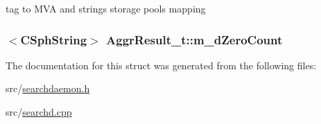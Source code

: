 tag to M\-V\-A and strings storage pools mapping 

\hypertarget{structAggrResult__t_a5b6c26a144fa7054522ef8f52f14e06a}{
\subsubsection[{m\-\_\-d\-Zero\-Count}]{$<${\bf C\-Sph\-String}$>$ Aggr\-Result\-\_\-t\-::m\-\_\-d\-Zero\-Count}}\label{structAggrResult__t_a5b6c26a144fa7054522ef8f52f14e06a}


The documentation for this struct was generated from the following files\-:\begin{DoxyCompactItemize}
\item 
src/\hyperlink{searchdaemon_8h}{searchdaemon.\-h}\item 
src/\hyperlink{searchd_8cpp}{searchd.\-cpp}\end{DoxyCompactItemize}
